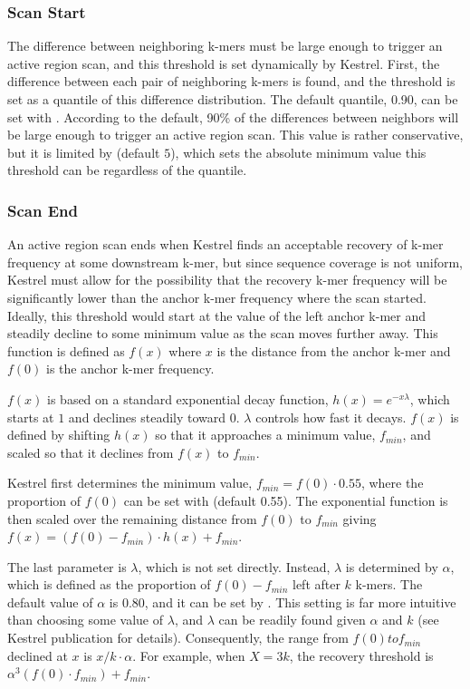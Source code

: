\subsubsection{Scan Start}
\label{sec.process.ardetect.start}

The difference between neighboring k-mers must be large enough to trigger an active region scan, and this threshold is set dynamically by Kestrel. First, the difference between each pair of neighboring k-mers is found, and the threshold is set as a quantile of this difference distribution. The default quantile, 0.90, can be set with . According to the default, 90\% of the differences between neighbors will be large enough to trigger an active region scan. This value is rather conservative, but it is limited by  (default $5$), which sets the absolute minimum value this threshold can be regardless of the quantile.

\subsubsection{Scan End}
\label{sec.process.ardetect.end}

An active region scan ends when Kestrel finds an acceptable recovery of k-mer frequency at some downstream k-mer, but since sequence coverage is not uniform, Kestrel must allow for the possibility that the recovery k-mer frequency will be significantly lower than the anchor k-mer frequency where the scan started. Ideally, this threshold would start at the value of the left anchor k-mer and steadily decline to some minimum value as the scan moves further away. This function is defined as $f(x)$ where $x$ is the distance from the anchor k-mer and $f(0)$ is the anchor k-mer frequency.

$f(x)$ is based on a standard exponential decay function, $h(x) = e^{-x \lambda}$, which starts at $1$ and declines steadily toward $0$. $\lambda$ controls how fast it decays. $f(x)$ is defined by shifting $h(x)$ so that it approaches a minimum value, $f_{min}$, and scaled so that it declines from $f(x)$ to $f_{min}$.

Kestrel first determines the minimum value, $f_{min} = f(0) \cdot 0.55$, where the proportion of $f(0)$ can be set with  (default 0.55). The exponential function is then scaled over the remaining distance from $f(0)$ to $f_{min}$ giving $f(x) = (f(0) - f_{min}) \cdot h(x) + f_{min}$.

The last parameter is $\lambda$, which is not set directly. Instead, $\lambda$ is determined by $\alpha$, which is defined as the proportion of $f(0) - f_{min}$ left after $k$ k-mers. The default value of $\alpha$ is $0.80$, and it can be set by . This setting is far more intuitive than choosing some value of $\lambda$, and $\lambda$ can be readily found given $\alpha$ and $k$ (see Kestrel publication for details). Consequently, the range from $f(0) to f_{min}$ declined at $x$ is $x / k \cdot \alpha$. For example, when $X = 3k$, the recovery threshold is $\alpha^3 (f(0) \cdot f_{min}) + f_{min}$.

